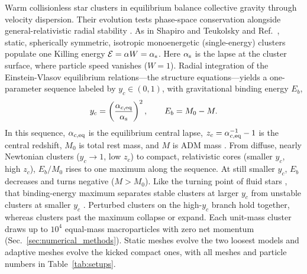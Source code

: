 Warm collisionless star clusters in equilibrium balance collective gravity through velocity dispersion. Their evolution tests phase-space conservation alongside general-relativistic radial stability \cite{1968ApJ...154..251I,1980ApJ...238.1101I,1985ApJ...298...34S,1985ApJ...298...58S}. As in Shapiro and Teukolsky \cite{1985ApJ...298...34S,1985ApJ...298...58S} and Ref.~\cite{Wu:2026nrpic}, static, spherically symmetric, isotropic monoenergetic (single-energy) clusters populate one Killing energy $\mathcal{E} = \alpha W = \alpha_{\rm s}$. Here $\alpha_{\rm s}$ is the lapse at the cluster surface, where particle speed vanishes ($W = 1$). Radial integration of the Einstein-Vlasov equilibrium relations---the structure equations---yields a one-parameter sequence labeled by $y_c \in (0, 1)$, with gravitational binding energy $E_b$,
\begin{equation}\label{eq:cluster_sequence}
y_c = \left(\frac{\alpha_{c,\rm eq}}{\alpha_{\rm s}}\right)^2, \qquad
E_b = M_0 - M.
\end{equation}
In this sequence, $\alpha_{c,\rm eq}$ is the equilibrium central lapse, $z_c = \alpha_{c,\rm eq}^{-1} - 1$ is the central redshift, $M_0$ is total rest mass, and $M$ is ADM mass \cite{1985ApJ...298...34S,Andreasson:2011ng}. From diffuse, nearly Newtonian clusters ($y_c \to 1$, low $z_c$) to compact, relativistic cores (smaller $y_c$, high $z_c$), $E_b/M_0$ rises to one maximum along the sequence. At still smaller $y_c$, $E_b$ decreases and turns negative ($M > M_0$). Like the turning point of fluid stars \cite{Chandrasekhar:1964zz,Friedman:1988er}, that binding-energy maximum separates stable clusters at larger $y_c$ from unstable clusters at smaller $y_c$ \cite{1980ApJ...238.1101I,1985ApJ...298...58S,Wu:2026nrpic}. Perturbed clusters on the high-$y_c$ branch hold together, whereas clusters past the maximum collapse or expand. Each unit-mass cluster draws up to $10^4$ equal-mass macroparticles with zero net momentum (Sec.~\ref{sec:numerical_methods}). Static meshes evolve the two loosest models and adaptive meshes evolve the kicked compact ones, with all meshes and particle numbers in Table~\ref{tab:setups}.

